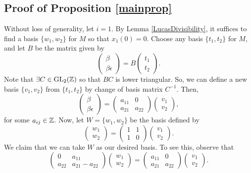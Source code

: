 \documentclass[11pt]{amsart}
\begin{document}
\subsection*{Proof of Proposition \ref{mainprop}} Without loss of generality, let $i=1$. By Lemma \ref{LucasDivisibility}, it suffices to find a basis $\{w_1, w_2\}$ for $M$ so that $x_1(0)=0$. Choose any basis $\{t_1, t_2\}$ for $M$, and let $B$ be the matrix given by
\[\begin{pmatrix} \beta \\ \beta \epsilon \end{pmatrix}=B \begin{pmatrix} t_1 \\ t_2\end{pmatrix}.\]
Note that $\exists C \in \operatorname{GL}_2(\mathbb{Z})$ so that $BC$ is lower triangular. So, we can define a new basis $\{v_1, v_2\}$ from $\{t_1, t_2\}$ by change of basis matrix $C^{-1}$. Then,
\begin{equation}\label{quadmatrix1}
 \begin{pmatrix} \beta \\ \beta \epsilon \end{pmatrix}=\begin{pmatrix} a_{11} & 0 \\ a_{21} & a_{22} \end{pmatrix} \begin{pmatrix} v_1 \\ v_2 \end{pmatrix},
\end{equation}
for some $a_{ij} \in \mathbb{Z}$. Now, let $W=\{w_1, w_2\}$ be the basis defined by
\[\begin{pmatrix} w_1 \\ w_2 \end{pmatrix} =\begin{pmatrix} 1 & 1 \\ 1 & 0 \end{pmatrix} \begin{pmatrix} v_1 \\ v_2\end{pmatrix}.\]
We claim that we can take $W$ as our desired basis. To see this, observe that
\[ \begin{pmatrix} 0 & a_{11} \\ a_{22} & a_{21}-a_{22} \end{pmatrix} \begin{pmatrix} w_1 \\ w_2 \end{pmatrix} =
\begin{pmatrix} a_{11} & 0 \\ a_{21} & a_{22} \end{pmatrix} \begin{pmatrix} v_1 \\ v_2 \end{pmatrix}.\]
\end{document}
